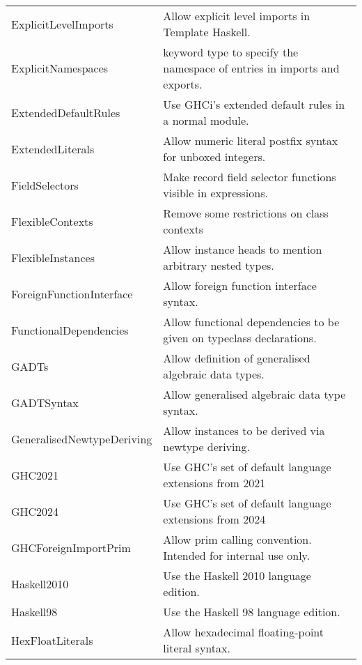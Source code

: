 \documentclass[openany, 12pt]{book}
\begin{document}
\begin{center}
\begin{supertabular}{ll}
		ExplicitLevelImports       & Allow explicit level imports in Template Haskell.                          \\
		ExplicitNamespaces         & keyword type to specify the namespace of entries in imports and exports.   \\
		ExtendedDefaultRules       & Use GHCi's extended default rules in a normal module.                      \\
		ExtendedLiterals           & Allow numeric literal postfix syntax for unboxed integers.                 \\
		FieldSelectors             & Make record field selector functions visible in expressions.               \\
		FlexibleContexts           & Remove some restrictions on class contexts                                 \\
		FlexibleInstances          & Allow instance heads to mention arbitrary nested types.                    \\
		ForeignFunctionInterface   & Allow foreign function interface syntax.                                   \\
		FunctionalDependencies     & Allow functional dependencies to be given on typeclass declarations.       \\
		GADTs                      & Allow definition of generalised algebraic data types.                      \\
		GADTSyntax                 & Allow generalised algebraic data type syntax.                              \\
		GeneralisedNewtypeDeriving & Allow instances to be derived via newtype deriving.                        \\
		GHC2021                    & Use GHC’s set of default language extensions from 2021                     \\
		GHC2024                    & Use GHC’s set of default language extensions from 2024                     \\
		GHCForeignImportPrim       & Allow prim calling convention. Intended for internal use only.             \\
		Haskell2010                & Use the Haskell 2010 language edition.                                     \\
		Haskell98                  & Use the Haskell 98 language edition.                                       \\
		HexFloatLiterals           & Allow hexadecimal floating-point literal syntax.                           \\

\end{supertabular}
\end{center}
\end{document}
